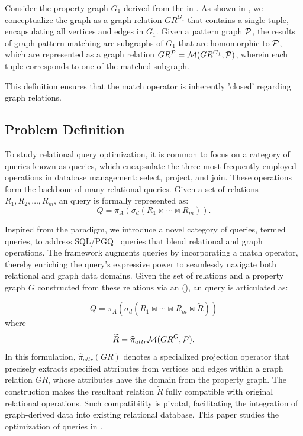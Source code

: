 \begin{example}
    \label{ex:matching}
    Consider the property graph \(G_1\) derived from the \rgmapping in . As shown in , we conceptualize the graph as a graph relation \(GR^{G_1}\) that contains a single tuple, encapsulating all vertices and edges in \(G_1\).
    Given a pattern graph \(\mathcal{P}\), the results of graph pattern matching are subgraphs of \(G_1\) that are homomorphic to \(\mathcal{P}\), which are represented as a graph relation \(GR^{\mathcal{P}} = \mathcal{M}(GR^{G_1}, \mathcal{P})\), wherein each tuple corresponds to one of the matched subgraph.
\end{example}

This definition ensures that the match operator is inherently 'closed' regarding graph relations.


\subsection{Problem Definition}
\label{sec:problem-definition}

To study relational query optimization, it is common to focus on a category of queries known as \spj queries,
which encapsulate the three most frequently employed operations in database management: select, project, and join.
These operations form the backbone of many relational queries. Given a set of relations \(R_1, R_2, \ldots, R_m\),
an \spj query is formally represented as:
\[
Q = \pi_A(\sigma_d(R_1 \Join \cdots \Join R_m)).
\]

Inspired from the \spj paradigm, we introduce a novel category of queries, termed \spjm queries, to address SQL/PGQ~\cite{sql-pgq} queries that
blend relational and graph operations. The \spjm framework augments \spj queries by incorporating a match operator, thereby enriching the query's expressive power to seamlessly navigate both relational and graph data domains.
Given the set of relations and a property graph \(G\) constructed from these relations via an \rgmapping (),
an \spjm query is articulated as:

\begin{equation}
    \label{eq:spjm}
Q = \pi_A(\sigma_d(R_1 \Join \cdots \Join R_m \Join \widetilde{R}))
\end{equation}
where
\[
\widetilde{R} = \widehat{\pi}_{attr}\mathcal{M}(GR^G, \mathcal{P}).
\]
In this formulation, \(\widehat{\pi}_{attr}(GR)\) denotes a specialized projection operator that precisely extracts specified attributes
from vertices and edges within a graph relation $GR$, whose attributes have the domain from the property graph.
The construction makes the resultant relation \(\tilde{R}\) fully compatible with original relational operations.
Such compatibility is pivotal, facilitating the integration of graph-derived data into existing relational database.
This paper studies the optimization of \spjm queries in .


